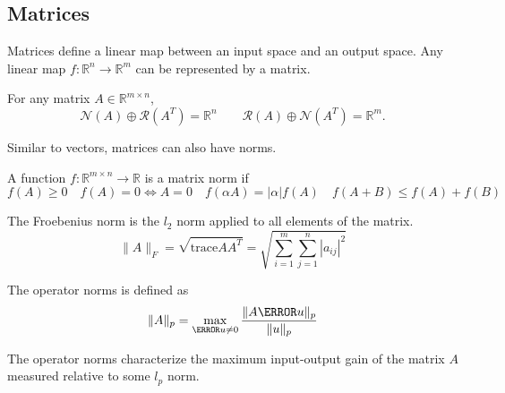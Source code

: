 \subsection{Matrices}
Matrices define a linear map between an input space and an output space. 
Any linear map $f: \mathbb{R}^n \to \mathbb{R}^m$ can be represented by a matrix.
\begin{theorem}
  For any matrix $A\in\mathbb{R}^{m\times n}$,
  \[
	\mathcal{N}(A) \oplus \mathcal{R}(A^T) = \mathbb{R}^n \qquad \mathcal{R}(A) \oplus \mathcal{N}(A^T) = \mathbb{R}^m.
  \]
  \label{thm:fundamental}
\end{theorem}
Similar to vectors, matrices can also have norms.
\begin{definition}
  A function $f: \mathbb{R}^{m\times n} \to \mathbb{R}$ is a matrix norm if 
  \[
	f(A) \geq 0 \quad f(A) = 0 \Leftrightarrow A = 0 \quad f(\alpha A) = |\alpha| f(A) \quad f(A+B) \leq f(A) + f(B)
  \]
  \label{defn:matrix-norm}
\end{definition}
\begin{definition}
  The Froebenius norm is the $l_2$ norm applied to all elements of the matrix.
  \[
	\|A\|_F = \sqrt{\text{trace} AA^T} = \sqrt{\sum_{i=1}^m \sum_{j=1}^n |a_{ij}|^2}
  \]
  \label{defn:froebenius-norm}
\end{definition}
\begin{definition}
  The operator norms is defined as
  \[
	\|A\|_p = \max_{\V{u}\ne0} \frac{\|A\V{u}\|_p}{\|u\|_p}
  \]
  \label{defn:operator-norm}
\end{definition}
The operator norms characterize the maximum input-output gain of the matrix $A$ measured relative to some $l_p$ norm.
